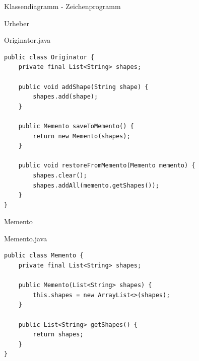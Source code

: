 
\begin{frame}{Klassendiagramm - Zeichenprogramm}
\end{frame}

\begin{frame}[fragile]{Urheber}
	\begin{exampleblock}{Originator.java}
 		\begin{lstlisting}
public class Originator {
    private final List<String> shapes;

    public void addShape(String shape) {
        shapes.add(shape);
    }

    public Memento saveToMemento() {
        return new Memento(shapes);
    }

    public void restoreFromMemento(Memento memento) {
        shapes.clear();
        shapes.addAll(memento.getShapes());
    }
}

 		\end{lstlisting}
 	\end{exampleblock}
\end{frame}

\begin{frame}[fragile]{Memento}
	\begin{exampleblock}{Memento.java}
 		\begin{lstlisting}
public class Memento {
    private final List<String> shapes;

    public Memento(List<String> shapes) {
        this.shapes = new ArrayList<>(shapes);
    }

    public List<String> getShapes() {
        return shapes;
    }
}
 		\end{lstlisting}
 	\end{exampleblock}
\end{frame}

